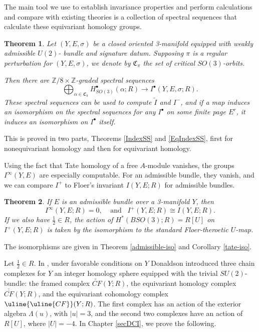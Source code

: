 \documentclass{memo-l}
\newtheorem{theorem}{Theorem}[chapter]
\theoremstyle{definition}
\theoremstyle{remark}
\numberwithin{section}{chapter}
\numberwithin{equation}{chapter}
\begin{document}
The main tool we use to establish invariance properties and perform calculations and compare with existing theories is a collection of spectral sequences that calculate these equivariant homology groups.

\begin{theorem}Let $(Y,E,\sigma)$ be a closed oriented 3-manifold equipped with weakly admissible $U(2)$- bundle and signature datum. Supposing $\pi$ is a regular perturbation for $(Y,E,\sigma)$, we denote by $\mathfrak C_\pi$ the set of critical $SO(3)$-orbits.

Then there are $\mathbb Z/8 \times \mathbb Z$-graded spectral sequences $$\bigoplus_{\alpha \in \mathfrak C_\pi} H^\bullet_{SO(3)}(\alpha;R) \to I^\bullet(Y,E,\sigma;R).$$ These spectral sequences can be used to compute $\widetilde I$ and $I^-$, and if a map induces an isomorphism on the spectral sequences for any $I^\bullet$ on some finite page $E^r$, it induces an isomorphism on $I^\bullet$ itself.
\end{theorem}

This is proved in two parts, Theorems \ref{IndexSS} and \ref{EqIndexSS}, first for nonequivariant homology and then for equivariant homology.

Using the fact that Tate homology of a free $A$-module vanishes, the groups $I^\infty(Y,E)$ are especially computable. For an admissible bundle, they vanish, and we can compare $I^+$ to Floer's invariant $I(Y,E;R)$ for admissible bundles. 

\begin{theorem}\label{intro-admiss}If $E$ is an admissible bundle over a 3-manifold $Y$, then $$I^\infty(Y,E;R) = 0, \;\;\;\; \text{and} \;\;\; I^+(Y,E;R) \cong I(Y,E;R).$$ If we also have $\frac 12 \in R$, the action of $H^*(BSO(3);R) = R[U]$ on $I^+(Y,E;R)$ is taken by the isomorphism to the standard Floer-theroetic $U$-map.
\end{theorem}

The isomorphisms are given in Theorem \ref{admissible-iso} and Corollary \ref{tate-iso}.

Let $\frac 12 \in R$. In \cite{Don}, under favorable conditions on $Y$ Donaldson introduced three chain complexes for $Y$ an integer homology sphere equipped with the trivial $SU(2)$-bundle: the framed complex $\widetilde{CF}(Y;R)$, the equivariant homology complex $\overline{\overline{CF}}(Y;R)$, and the equivariant cohomology complex $\uline{\uline{CF}}(Y;R)$. The first complex has an action of the exterior algebra $\Lambda(u)$, with $|u| = 3$, and the second two complexes have an action of $R[U]$, where $|U| = -4$. In Chapter \ref{secDCI}, we prove the following.
\end{document}
